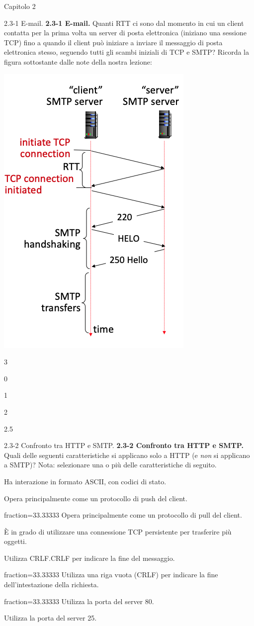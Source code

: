 \documentclass[11pt]{article}
\begin{document}
\begin{quiz}{Capitolo 2}
\begin{multi}[points=1,shuffle]{2.3-1 E-mail.}
\textbf{2.3-1 E-mail.} 
Quanti RTT ci sono dal momento in cui un client contatta per la prima volta un server di posta elettronica (iniziano una sessione TCP) fino a quando il client può iniziare a inviare il messaggio di posta elettronica stesso, seguendo tutti gli scambi iniziali di TCP e SMTP? 
Ricorda la figura sottostante dalle note della nostra lezione:

\begin{center}
\includegraphics[width=.4\linewidth]{figs/2.3.1.jpg}
\end{center}

\item* 3
\item 0
\item 1
\item 2
\item 2.5
\end{multi}
        

\begin{multi}[points=1,shuffle,multiple]{2.3-2 Confronto tra HTTP e SMTP.}
\textbf{2.3-2 Confronto tra HTTP e SMTP.} 
Quali delle seguenti caratteristiche si applicano solo a HTTP (e \emph{non} si applicano a SMTP)?  
Nota: selezionare una o più delle caratteristiche di seguito.

\item Ha interazione in formato ASCII, con codici di stato.
\item Opera principalmente come un protocollo di push del client.
\item[fraction=33.33333] Opera principalmente come un protocollo di pull del client.
\item È in grado di utilizzare una connessione TCP persistente per trasferire più oggetti.
\item Utilizza CRLF.CRLF per indicare la fine del messaggio.
\item[fraction=33.33333] Utilizza una riga vuota (CRLF) per indicare la fine dell'intestazione della richiesta.
\item[fraction=33.33333] Utilizza la porta del server 80.
\item Utilizza la porta del server 25.
\end{multi}
            


\end{quiz}
\end{document}
